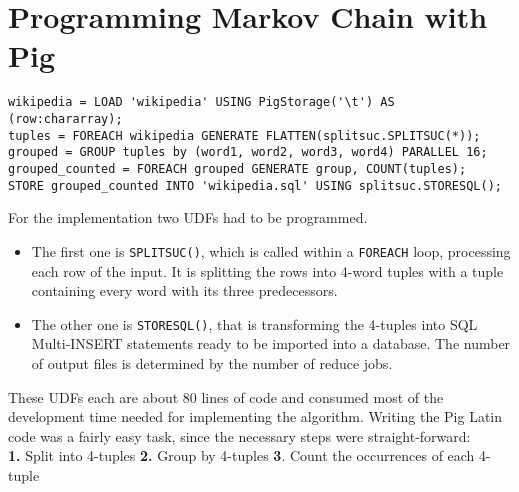 \section{Programming Markov Chain with Pig}                                              
                         
\begin{lstlisting}[language=pig,caption=Markov Chain in Pig Latin,label=pigmarkovstructure,columns=fullflexible]    
wikipedia = LOAD 'wikipedia' USING PigStorage('\t') AS (row:chararray);
tuples = FOREACH wikipedia GENERATE FLATTEN(splitsuc.SPLITSUC(*));
grouped = GROUP tuples by (word1, word2, word3, word4) PARALLEL 16;
grouped_counted = FOREACH grouped GENERATE group, COUNT(tuples);
STORE grouped_counted INTO 'wikipedia.sql' USING splitsuc.STORESQL();
\end{lstlisting}                  

For the implementation two UDFs had to be programmed. 
\begin{itemize}
\item The first one is {\tt SPLITSUC()}, which is called within a {\tt FOREACH} loop, processing each row of the input. It is splitting the rows into 4-word tuples with a tuple containing every word with its three predecessors.
\item The other one is {\tt STORESQL()}, that is transforming the 4-tuples into SQL Multi-INSERT statements ready to be imported into a database. The number of output files is determined by the number of reduce jobs.
\end{itemize}

These UDFs each are about 80 lines of code and consumed most of the development time needed for implementing the algorithm. Writing the Pig Latin code was a fairly easy task, since the necessary steps were straight-forward: \\
{\bf 1.} Split into 4-tuples {\bf 2.} Group by 4-tuples {\bf 3}. Count the occurrences of each 4-tuple



